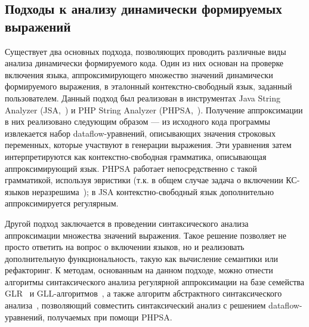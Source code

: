 
\subsection{Подходы к анализу динамически формируемых выражений}

Существует два основных подхода, позволяющих проводить различные виды анализа динамически формируемого кода. Один из них основан на проверке включения языка, аппроксимирующего множество значений динамически формируемого выражения, в эталонный контекстно-свободный язык, заданный пользователем. 
Данный подход был реализован в инструментах Java String Analyzer (JSA,~\cite{jsa}) и PHP String Analyzer (PHPSA,~\cite{phpsa}). %
Получение аппроксимации в них реализовано следующим образом --- из исходного кода программы извлекается набор dataflow-уравнений, описывающих значения строковых переменных, которые участвуют в генерации выражения. Эти уравнения затем интерпретируются как контекстно-свободная грамматика, описывающая аппроксимирующий язык. PHPSA работает непосредственно с такой грамматикой, используя эвристики (т.к. в общем случае задача о включении КС-языков неразрешима~\cite{lang_inclusion}); в JSA контекстно-свободный язык дополнительно аппроксимируется регулярным.


Другой подход заключается в проведении синтаксического анализа аппроксимации множества значений выражения. 
Такое решение позволяет не просто ответить на вопрос о включении языков, но и реализовать дополнительную функциональность, такую как вычисление семантики или рефакторинг. 
К методам, основанным на данном подходе, можно отнести алгоритмы синтаксического анализа регулярной аппроксимации на базе семейства GLR~\cite{alvor, rnglr_reg} и GLL-алгоритмов~\cite{gll_reg}, а также алгоритм абстрактного синтаксического анализа~\cite{a_lr}, позволяющий совместить синтаксический анализ с решением dataflow-уравнений, получаемых при помощи PHPSA.

